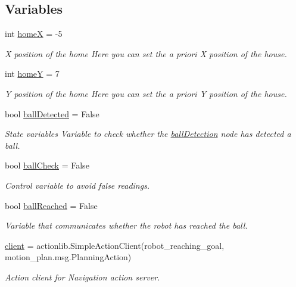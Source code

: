 \subsection*{Variables}
\begin{DoxyCompactItemize}
\item 
int \hyperlink{namespacecommandManager_afd4e45cbe13ed5ee1c795062ed21e184}{homeX} = -\/5
\begin{DoxyCompactList}\small\item\em X position of the home Here you can set the a priori X position of the house. \end{DoxyCompactList}\item 
int \hyperlink{namespacecommandManager_a9deb4aa18f5f193991dbfb07d1f8e0b3}{homeY} = 7
\begin{DoxyCompactList}\small\item\em Y position of the home Here you can set the a priori Y position of the house. \end{DoxyCompactList}\item 
bool \hyperlink{namespacecommandManager_a4ed98b9d98c0860f84ddfa04bb3c5930}{ball\+Detected} = False
\begin{DoxyCompactList}\small\item\em State variables Variable to check whether the \hyperlink{namespaceballDetection}{ball\+Detection} node has detected a ball. \end{DoxyCompactList}\item 
bool \hyperlink{namespacecommandManager_a98d638b22b400e4c4bce2f95e8f69363}{ball\+Check} = False
\begin{DoxyCompactList}\small\item\em Control variable to avoid false readings. \end{DoxyCompactList}\item 
bool \hyperlink{namespacecommandManager_a2addbd14eb79fa7c8751337f7a27067b}{ball\+Reached} = False
\begin{DoxyCompactList}\small\item\em Variable that communicates whether the robot has reached the ball. \end{DoxyCompactList}\item 
\hyperlink{namespacecommandManager_ad81f5cdd9bf18b67989c77a2329b9e28}{client} = actionlib.\+Simple\+Action\+Client(\textquotesingle{}robot\+\_\+reaching\+\_\+goal\textquotesingle{}, motion\+\_\+plan.\+msg.\+Planning\+Action)
\begin{DoxyCompactList}\small\item\em Action client for Navigation action server. \end{DoxyCompactList}\end{DoxyCompactItemize}


